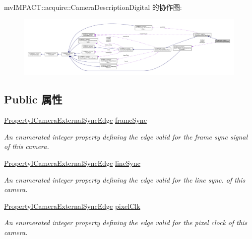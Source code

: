 mv\+I\+M\+P\+A\+C\+T\+:\+:acquire\+:\+:Camera\+Description\+Digital 的协作图\+:
\nopagebreak
\begin{figure}[H]
\begin{center}
\leavevmode
\includegraphics[width=350pt]{classmv_i_m_p_a_c_t_1_1acquire_1_1_camera_description_digital__coll__graph}
\end{center}
\end{figure}
\subsection*{Public 属性}
\begin{DoxyCompactItemize}
\item 
\hyperlink{group___device_specific_interface_gaac63793b596b074fc5012dd82aafd035}{Property\+I\+Camera\+External\+Sync\+Edge} \hyperlink{classmv_i_m_p_a_c_t_1_1acquire_1_1_camera_description_digital_a645b292f957b6124ac83181de0afae0b}{frame\+Sync}
\begin{DoxyCompactList}\small\item\em An enumerated integer property defining the edge valid for the frame sync signal of this camera. \end{DoxyCompactList}\item 
\hyperlink{group___device_specific_interface_gaac63793b596b074fc5012dd82aafd035}{Property\+I\+Camera\+External\+Sync\+Edge} \hyperlink{classmv_i_m_p_a_c_t_1_1acquire_1_1_camera_description_digital_a777652c7193f75207a48601790a19762}{line\+Sync}
\begin{DoxyCompactList}\small\item\em An enumerated integer property defining the edge valid for the line sync. of this camera. \end{DoxyCompactList}\item 
\hyperlink{group___device_specific_interface_gaac63793b596b074fc5012dd82aafd035}{Property\+I\+Camera\+External\+Sync\+Edge} \hyperlink{classmv_i_m_p_a_c_t_1_1acquire_1_1_camera_description_digital_a2b852526d2ca8cc3203e64af6903596e}{pixel\+Clk}
\begin{DoxyCompactList}\small\item\em An enumerated integer property defining the edge valid for the pixel clock of this camera. \end{DoxyCompactList}\end{DoxyCompactItemize}
